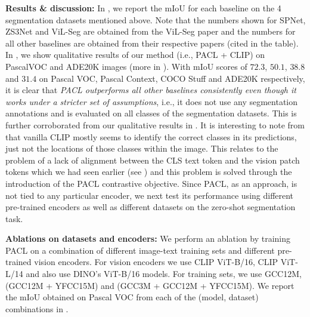 \documentclass[10pt,twocolumn,letterpaper]{article}
\begin{document}
\textbf{Results \& discussion:} In , we report the mIoU for each baseline on the 4 segmentation datasets mentioned above. Note that the numbers shown for SPNet, ZS3Net and ViL-Seg are obtained from the ViL-Seg paper \cite{liu2022open} and the numbers for all other baselines are obtained from their respective papers (cited in the table). In , we show qualitative results of our method (i.e., PACL + CLIP) on PascalVOC and ADE20K images (more in ). With mIoU scores of $72.3$, $50.1$, $38.8$ and $31.4$ on Pascal VOC, Pascal Context, COCO Stuff and ADE20K respectively, it is clear that \emph{PACL outperforms all other baselines consistently even though it works under a stricter set of assumptions}, i.e., it does not use any segmentation annotations and is evaluated on all classes of the segmentation datasets. This is further corroborated from our qualitative results in . It is interesting to note from  that vanilla CLIP mostly seems to identify the correct classes in its predictions, just not the locations of those classes within the image. This relates to the problem of a lack of alignment between the CLS text token and the vision patch tokens which we had seen earlier (see ) and this problem is solved through the introduction of the PACL contrastive objective. Since PACL, as an approach, is not tied to any particular encoder, we next test its performance using different pre-trained encoders as well as different datasets on the zero-shot segmentation task.

\textbf{Ablations on datasets and encoders:} We perform an ablation by training PACL on a combination of different image-text training sets and different pre-trained vision encoders. For vision encoders we use CLIP ViT-B/16, CLIP ViT-L/14 and also use DINO's \cite{caron2021emerging} ViT-B/16 models. For training sets, we use GCC12M, (GCC12M + YFCC15M) and (GCC3M + GCC12M + YFCC15M). We report the mIoU obtained on Pascal VOC from each of the (model, dataset) combinations in .
\end{document}
